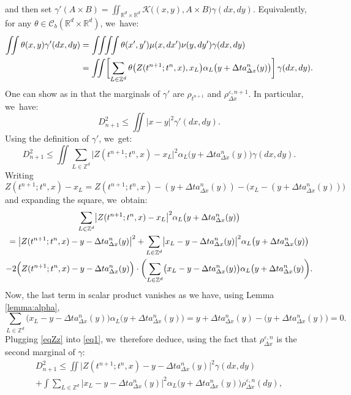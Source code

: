 \documentclass[JEP,XML,SOM,Unicode, NoFloatCountersInSection,published]{cedram}
\def\RR{\mathbb{R}}
\def\ZZ{\mathbb{Z}}
\def\intquad {\int\mbox{\hspace{-2mm}}\int\mbox{\hspace{-2mm}}\int\mbox{\hspace{-2mm}}\int}
\def\eps{\varepsilon}
\def\dt{\Delta t}
\def\dx{\Delta x}
\def\calC{{\mathcal C}}
\theoremstyle{plain}
\theoremstyle{definition}
\begin{document}
and then set $\gamma'(A \times B) = \iint_{\RR^d \times \RR^d} {\mathcal K} \bigl( (x,y),A \times B \bigr)
\gamma(dx,dy)$. Equivalently, for any $\theta \in \calC_b(\RR^d \times \RR^d)$, we~have:
\begin{align*}
\iint \theta(x,y) \gamma'(dx,dy) & = \intquad \theta(x',y') \mu(x, dx') \nu(y, dy') \gamma(dx,dy) \\
& = \iint \biggl[\sum_{L\in \ZZ^d} \theta\bigl(Z(t^{n+1};t^n,x),x_L\bigr)
\alpha_L\bigl(y+\dt a^n_{\dx}(y)\bigr)\biggr]\,\gamma(dx,dy).
\end{align*}
One can show as in \cite{dlv20} that the marginals of $\gamma'$ are $\rho_{t^{n+1}}$ and $\rho_{\dx}^{\eps,n+1}$. In particular, we~have:
\[
D_{n+1}^2 \leq \iint |x-y|^2 \gamma'(dx,dy).
\]
Using the definition of $\gamma'$, we~get:
\begin{equation}\label{eq1}
D_{n+1}^2 \leq \iint \sum_{L\in \ZZ^d} \bigl|Z(t^{n+1};t^n,x)-x_L\bigr|^2 \alpha_L \bigl(y+\dt a^n_{\dx}(y)\bigr) \gamma(dx,dy).
\end{equation}
Writing
\[
Z(t^{n+1};t^n,x)-x_L = Z(t^{n+1};t^n,x) - (y+\dt a^n_{\dx}(y)) - \big(x_L - (y+\dt a^n_{\dx}(y))\big)
\]
and expanding the square, we~obtain:\vspace*{-3pt}
\begin{multline}\label{eqZz}
\sum_{L\in \ZZ^d}\bigl|Z(t^{n+1};t^n,x) - x_L\bigr|^2 \alpha_L\bigl(y+\dt a^n_{\dx}(y)\bigr)\\
= \bigl|Z(t^{n+1};t^n,x) - y - \dt a^n_{\dx}(y) \bigr|^2 + \sum_{L\in \ZZ^d} \bigl|x_L - y - \dt a^n_{\dx}(y)
\bigr|^2 \alpha_L\bigl(y+\dt a^n_{\dx}(y)\bigr)
\\
-2\Bigl( Z(t^{n+1};t^n,x) - y - \dt a^n_{\dx}(y) \Bigr) \cdot
\biggl( \sum_{L \in \ZZ^d}
\bigl(x_L-y-\dt a^n_{\dx}(y)\bigr) \alpha_L\bigl(y+\dt a^n_{\dx}(y) \biggr).
\end{multline}
Now, the last term in scalar product vanishes as we have, using Lemma \ref{lemma:alpha},\vspace*{-3pt}
\[
\sum_{L\in \ZZ^d} \bigl(x_L-y-\dt a^n_{\dx}(y)\bigr) \alpha_L\bigl(y+\dt a^n_{\dx}(y)\bigr) = y+\dt a^n_{\dx}(y) - \big(y+\dt a^n_{\dx}(y)\big) = 0.
\]
Plugging \eqref{eqZz} into \eqref{eq1}, we~therefore deduce, using the fact that $\rho_{\dx}^{\eps,n}$ is the second marginal of $\gamma$:\vspace*{-3pt}
\begin{multline}\label{eq2}
D_{n+1}^2 \leq
\iint \bigl|Z(t^{n+1};t^n,x)-y-\dt a^n_{\dx}(y)\bigr|^2 \gamma(dx,dy) \\[-3pt]
+ \int \sum_{L\in \ZZ^d} \bigl|x_L-y-\dt a^n_{\dx}(y) \bigr|^2 \alpha_L\bigl(y+\dt a^n_{\dx}(y)\bigr) \rho_{\dx}^{\eps,n}(dy),
\end{multline}
\end{document}
